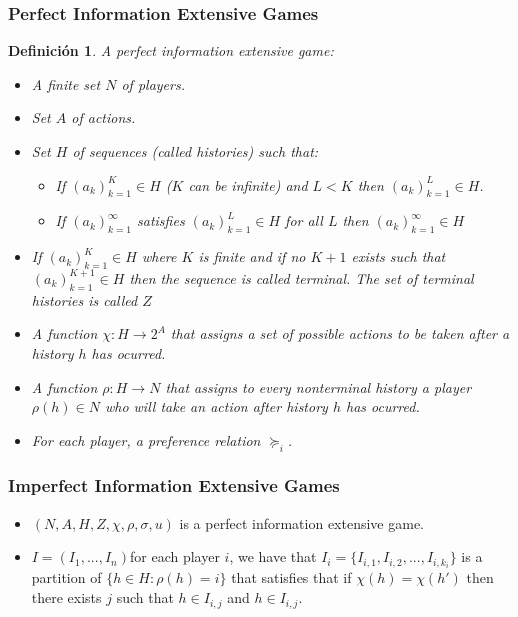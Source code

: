 \documentclass{beamer}
\theoremstyle{plain}
\newtheorem{defi}[teo]{Definición}
\begin{document}
\begin{frame}[allowframebreaks]
\frametitle{Perfect Information Extensive Games}
\begin{defi}
A perfect information extensive game:
\begin{itemize}
\item A finite set  $N$ of players.
\item Set $A$ of actions.
\item Set $H$ of sequences (called histories) such that:
	\begin{itemize}
		\item If $(a_k)_{k=1}^K \in H$ ($K$ can be infinite) and $L < K$ then $(a_k)_{k=1}^L \in H$.
		\item If $(a_k)_{k=1}^\infty$ satisfies $(a_k)_{k=1}^L \in H$ for all $L$ then $(a_k)_{k=1}^\infty \in H$
	\end{itemize}
\item If $(a_k)_{k=1}^K \in H$ where $K$ is finite and if no $K+1$ exists such that $(a_k)_{k=1}^{K+1} \in H$ then the sequence is called terminal. The set of terminal histories is called $Z$
\item A function $\chi : H \to 2^A$  that assigns a set of possible actions to be taken after a history $h$ has ocurred.
\item A function $\rho: H \to N$ that assigns to every nonterminal history a player $\rho(h) \in N$ who will take an action after history $h$ has ocurred.
\item For each player, a preference relation $\succeq_i$.
\end{itemize}
\end{defi}
\end{frame}

\begin{frame}
\frametitle{Imperfect Information Extensive Games}
\begin{itemize}
\item $(N,A,H,Z,\chi,\rho,\sigma, u)$ is a perfect information extensive game.
\item $I=(I_1,...,I_n)$for each player $i$, we have that  $I_i = \{ I_{i,1}, I_{i,2}, ... , I_{i,k_i} \}$ is a partition of $\{ h \in H: \rho(h)=i \}$ that satisfies that if $\chi(h)=\chi(h')$ then there exists $j$  such that $h \in I_{i,j}$ and $h \in I_{i,j}$.
\end{itemize}
\end{frame}
\end{document}
